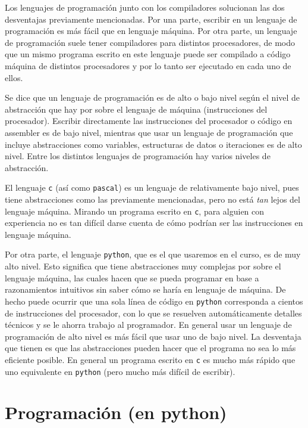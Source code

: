 \documentclass[a4paper, 12pt]{report}
\theoremstyle{definition}
\begin{document}
Los lenguajes de programación junto con los compiladores solucionan las dos desventajas previamente mencionadas. Por una parte, escribir en un lenguaje de programación es más fácil que en lenguaje máquina. Por otra parte, un lenguaje de programación suele tener compiladores para distintos procesadores, de modo que un mismo programa escrito en este lenguaje puede ser compilado a código máquina de distintos procesadores y por lo tanto ser ejecutado en cada uno de ellos.

Se dice que un lenguaje de programación es de alto o bajo nivel según el nivel de abstracción que hay por sobre el lenguaje de máquina (instrucciones del procesador). Escribir directamente las instrucciones del procesador o código en assembler es de bajo nivel, mientras que usar un lenguaje de programación que incluye abstracciones como variables, estructuras de datos o iteraciones es de alto nivel. Entre los distintos lenguajes de programación hay varios niveles de abstracción.


El lenguaje {\tt c} (así como {\tt pascal}) es un lenguaje de relativamente bajo nivel, pues tiene abstracciones como las previamente mencionadas, pero no está {\sl tan} lejos del lenguaje máquina. Mirando un programa escrito en {\tt c}, para alguien con experiencia no es tan difícil darse cuenta de cómo podrían ser las instrucciones en lenguaje máquina.

Por otra parte, el lenguaje {\tt python}, que es el que usaremos en el curso, es de muy alto nivel. Esto significa que tiene abstracciones muy complejas por sobre el lenguaje máquina, las cuales hacen que se pueda programar en base a razonamientos intuitivos sin saber cómo se haría en lenguaje de máquina. De hecho puede ocurrir que una sola línea de código en {\tt python} corresponda a cientos de instrucciones del procesador, con lo que se resuelven automáticamente detalles técnicos y se le ahorra trabajo al programador. En general usar un lenguaje de programación de alto nivel es más fácil que usar uno de bajo nivel. La desventaja que tienen es que las abstracciones pueden hacer que el programa no sea lo más eficiente posible. En general un programa escrito en {\tt c} es mucho más rápido que uno equivalente en {\tt python} (pero mucho más difícil de escribir).


\chapter{Programación (en python)}\label{cap-prog}
\end{document}
